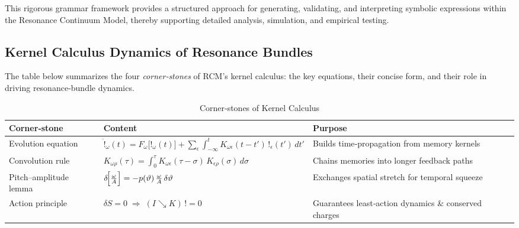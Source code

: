This rigorous grammar framework provides a structured approach for generating, validating, and interpreting symbolic expressions within the Resonance Continuum Model, thereby supporting detailed analysis, simulation, and empirical testing.



\subsection{Kernel Calculus \emdash Dynamics of Resonance Bundles}
\label{subsec3:kernel-calculus-emdash-dynamics-of-resonance-bundles}
\medskip
The table below summarizes the four \emph{corner‐stones} of RCM’s kernel calculus: the key equations, their concise form, and their role in driving resonance‐bundle dynamics.

\begin{table}[H]
  \small
  \centering
  \caption{Corner‐stones of Kernel Calculus}
  \label{tab:kernel-cornerstones}
  \begin{tabular}{@{}p{} p{} p{}@{}}
    \toprule
    \textbf{Corner‐stone}    & \textbf{Content}                                                                                                                                       & \textbf{Purpose}                                  \\
    \midrule
    Evolution equation       & \(\displaystyle
      \dot{!}_{\omega}(t)
      = F_{\omega}\bigl[!_{\omega}(t)\bigr]
      + \sum_{\epsilon}
        \int_{-\infty}^{t}
          K_{\omega\epsilon}(t-t')\,
          !_{\epsilon}(t')\,dt'
    \)                                                                                                            & Builds time‐propagation from memory kernels      \\
    Convolution rule         & \(\displaystyle
      K_{\omega\rho}(\tau)
      = \int_{0}^{\tau}
          K_{\omega\epsilon}(\tau-\sigma)\,
          K_{\epsilon\rho}(\sigma)\,d\sigma
    \)                                                                                                            & Chains memories into longer feedback paths       \\
    Pitch–amplitude lemma    & \(\displaystyle
      \delta\!\Bigl[\tfrac{\omega}{A}\Bigr]
      = -p(\vartheta)\,\tfrac{\omega}{A}\,\delta\vartheta
    \)                                                                                                            & Exchanges spatial stretch for temporal squeeze   \\
    Action principle         & \(\displaystyle
      \delta S = 0
      \;\Longrightarrow\;
      (I \searrow K)\,! = 0
    \)                                                                                                            & Guarantees least‐action dynamics \& conserved charges \\
    \bottomrule
  \end{tabular}
\end{table}

